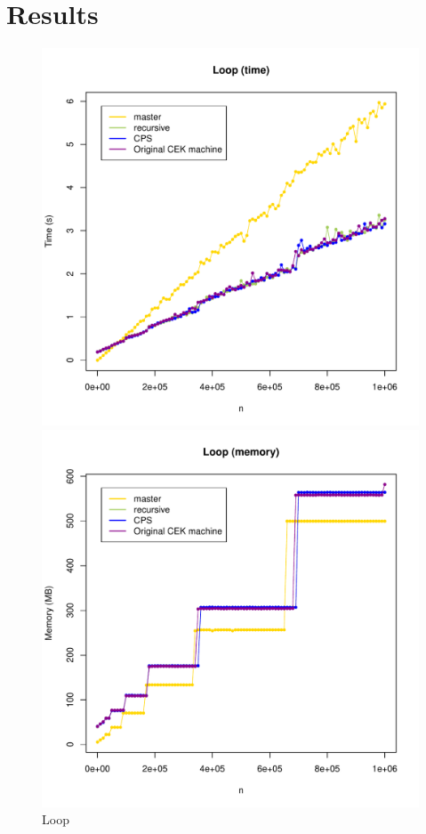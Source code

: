 \documentclass[a4paper]{article}
\begin{document}
\newpage
\section*{Results}
\begin{figure}[H]
\centering \includegraphics[width=0.8\linewidth]{loop-times.pdf}

\includegraphics[width=0.8\linewidth]{loop-mem.pdf}
\caption{Loop}\label{fig:loop-graphs}
\end{figure}
\newpage
\end{document}
